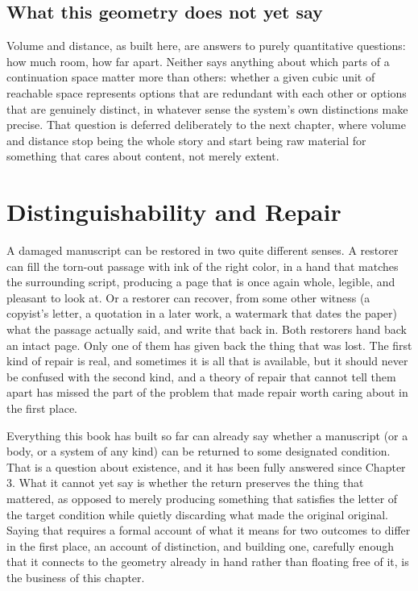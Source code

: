 \documentclass[11pt]{report}
\begin{document}
\section*{What this geometry does not yet say}

Volume and distance, as built here, are answers to purely quantitative
questions: how much room, how far apart. Neither says anything about
which parts of a continuation space matter more than others: whether
a given cubic unit of reachable space represents options that are
redundant with each other or options that are genuinely distinct, in
whatever sense the system's own distinctions make precise. That
question is deferred deliberately to the next chapter, where volume and
distance stop being the whole story and start being raw material for
something that cares about content, not merely extent.

\chapter{Distinguishability and Repair}

A damaged manuscript can be restored in two quite different senses.
A restorer can fill the torn-out passage with ink of the right color,
in a hand that matches the surrounding script, producing a page that
is once again whole, legible, and pleasant to look at. Or a restorer
can recover, from some other witness (a copyist's letter, a
quotation in a later work, a watermark that dates the paper) what
the passage actually said, and write that back in. Both restorers hand
back an intact page. Only one of them has given back the thing that
was lost. The first kind of repair is real, and sometimes it is all
that is available, but it should never be confused with the second
kind, and a theory of repair that cannot tell them apart has missed
the part of the problem that made repair worth caring about in the
first place.

Everything this book has built so far can already say whether a
manuscript (or a body, or a system of any kind) can be returned
to some designated condition. That is a question about existence, and
it has been fully answered since Chapter 3. What it cannot yet say is
whether the return preserves the thing that mattered, as opposed to
merely producing something that satisfies the letter of the target
condition while quietly discarding what made the original original.
Saying that requires a formal account of what it means for two
outcomes to differ in the first place, an account of distinction, and
building one, carefully enough that it connects to the geometry
already in hand rather than floating free of it, is the business of
this chapter.
\end{document}
